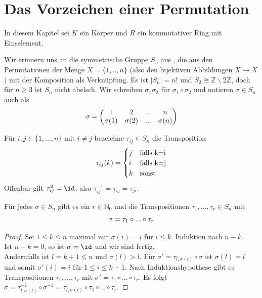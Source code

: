 \section{Das Vorzeichen einer Permutation}

In diesem Kapitel sei $K$ ein Körper und $R$ ein kommutativer Ring mit Einselement.

\begin{remark}
	Wir erinnern uns an die symmetrische Gruppe $S_n$ aus , die aus den Permutationen der Menge $X=\{1,..,n\}$ (also den 
	bijektiven Abbildungen $X\to X$) mit der Komposition als Verknüpfung. Es ist $\vert S_n\vert =n!$ und $S_2\cong \mathbb Z\backslash 2 \mathbb Z$, 
	doch für $n\ge 3$ ist $S_n$ nicht abelsch. Wir schreiben $\sigma_1\sigma_2$ für $\sigma_1\circ \sigma_2$ und notieren $\sigma\in S_n$ 
	auch als \\
	\begin{align}
		\sigma=\begin{pmatrix}
		1 & 2 & ... & n\\
		\sigma(1) & \sigma(2) & ... & \sigma(n)\\
		\end{pmatrix}\notag
	\end{align}
\end{remark}

\begin{example}
	Für $i,j\in \{1,...,n\}$ mit $i\neq j$ bezeichne $\tau_{ij}\in S_n$ die Transposition 
	\begin{align}
	\tau_{ij}(k)=
	\begin{cases}
	j&\text{falls }$k=i$ \\ i& \text{falls }$k=j$ \\ k& \text{sonst}
	\end{cases}\notag
	\end{align} Offenbar gilt $\tau_{ij}^2=\id$, also $\tau_{ij}^{-1}=\tau_{ij}=\tau_{ji}$.
\end{example}

\begin{proposition}
	Für jedes $\sigma \in S_n$ gibt es ein $r\in \mathbb N_0$ und die Transpositionen $\tau_1,...,\tau_r\in S_n$ mit 
	\begin{align}
		\sigma=\tau_1\circ ... \circ \tau_r\notag
	\end{align}
\end{proposition}
\begin{proof}
	Sei $1\le k \le n$ maximal mit $\sigma(i)=i$ für $i\le k$. Induktion nach $n-k$. \\
	Ist $n-k=0$, so ist $\sigma=\id$ und wir sind fertig. \\
	Andernfalls ist $l=k+1\le n$ und $\sigma(l)>l$. Für $\sigma'=\tau_{l,\sigma(l)}\circ \sigma$ ist $\sigma(l)=l$ und somit $\sigma'(i)=i$ 
	für $1\le i \le k+1$. Nach Induktionshypothese gibt es Transpositionen $\tau_1,...,\tau_r$ mit $\sigma'=\tau_1\circ ...\circ \tau_r$. 
	Es folgt $\sigma=\tau_{l,\sigma(l)}^{-1}\circ \sigma^{-1}=\tau_{l,\sigma(l)}\circ \tau_1\circ ... \circ \tau_r$.
\end{proof}

